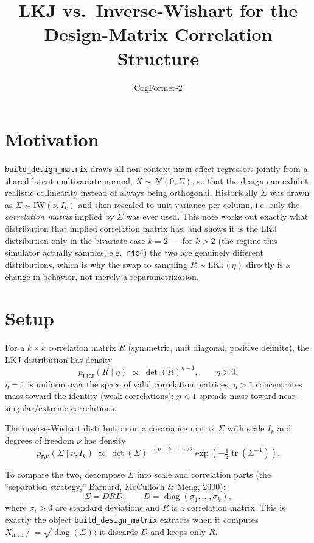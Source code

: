 \documentclass[11pt]{article}
\title{LKJ vs.\ Inverse-Wishart for the Design-Matrix Correlation Structure}
\author{CogFormer-2}
\date{}
\newcommand{\IW}{\mathrm{IW}}
\newcommand{\LKJ}{\mathrm{LKJ}}
\begin{document}
\maketitle

\section*{Motivation}

\texttt{build\_design\_matrix} draws all non-context main-effect regressors
jointly from a shared latent multivariate normal, $X \sim \mathcal N(0, \Sigma)$,
so that the design can exhibit realistic collinearity instead of always being
orthogonal. Historically $\Sigma$ was drawn as $\Sigma \sim \IW(\nu, I_k)$ and
then rescaled to unit variance per column, i.e. only the \emph{correlation
matrix} implied by $\Sigma$ was ever used. This note works out exactly what
distribution that implied correlation matrix has, and shows it is the LKJ
distribution only in the bivariate case $k=2$ --- for $k>2$ (the regime this
simulator actually samples, e.g.\ \texttt{r4c4}) the two are genuinely
different distributions, which is why the swap to sampling $R \sim \LKJ(\eta)$
directly is a change in behavior, not merely a reparametrization.

\section*{Setup}

For a $k\times k$ correlation matrix $R$ (symmetric, unit diagonal, positive
definite), the LKJ distribution has density
\[
  p_{\LKJ}(R \mid \eta) \;\propto\; \det(R)^{\eta - 1}, \qquad \eta > 0.
\]
$\eta = 1$ is uniform over the space of valid correlation matrices; $\eta > 1$
concentrates mass toward the identity (weak correlations); $\eta < 1$ spreads
mass toward near-singular/extreme correlations.

The inverse-Wishart distribution on a covariance matrix $\Sigma$ with scale
$I_k$ and degrees of freedom $\nu$ has density
\[
  p_{\IW}(\Sigma \mid \nu, I_k) \;\propto\;
  \det(\Sigma)^{-(\nu+k+1)/2} \exp\!\left(-\tfrac12 \operatorname{tr}(\Sigma^{-1})\right).
\]

To compare the two, decompose $\Sigma$ into scale and correlation parts
(the ``separation strategy,'' Barnard, McCulloch \& Meng, 2000):
\[
  \Sigma = D R D, \qquad D = \operatorname{diag}(\sigma_1,\dots,\sigma_k),
\]
where $\sigma_i > 0$ are standard deviations and $R$ is a correlation matrix.
This is exactly the object \texttt{build\_design\_matrix} extracts when it
computes $X_{\mathrm{mvn}} \mathrel{/}= \sqrt{\operatorname{diag}(\Sigma)}$: it
discards $D$ and keeps only $R$.
\end{document}
